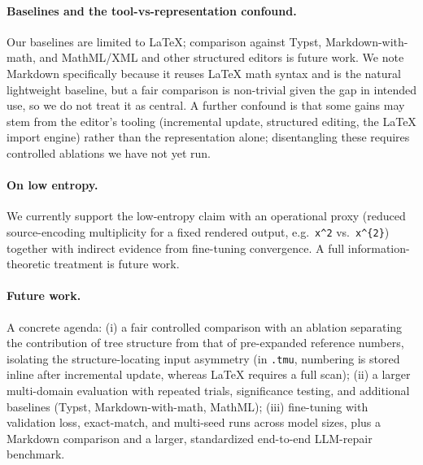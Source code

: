 \paragraph{Baselines and the tool-vs-representation confound.} Our baselines are limited to {\LaTeX}; comparison against Typst, Markdown-with-math, and MathML/XML and other structured editors is future work. We note Markdown specifically because it reuses {\LaTeX} math syntax and is the natural lightweight baseline, but a fair comparison is non-trivial given the gap in intended use, so we do not treat it as central. A further confound is that some gains may stem from the editor's tooling (incremental update, structured editing, the {\LaTeX} import engine) rather than the representation alone; disentangling these requires controlled ablations we have not yet run.

\paragraph{On low entropy.} We currently support the low-entropy claim with an operational proxy (reduced source-encoding multiplicity for a fixed rendered output, e.g.\ \texttt{x\^{}2} vs.\ \texttt{x\^{}\{2\}}) together with indirect evidence from fine-tuning convergence. A full information-theoretic treatment is future work.

\paragraph{Future work.} A concrete agenda: (i) a fair controlled comparison with an ablation separating the contribution of tree structure from that of pre-expanded reference numbers, isolating the structure-locating input asymmetry (in \texttt{.tmu}, numbering is stored inline after incremental update, whereas {\LaTeX} requires a full scan); (ii) a larger multi-domain evaluation with repeated trials, significance testing, and additional baselines (Typst, Markdown-with-math, MathML); (iii) fine-tuning with validation loss, exact-match, and multi-seed runs across model sizes, plus a Markdown comparison and a larger, standardized end-to-end LLM-repair benchmark.


